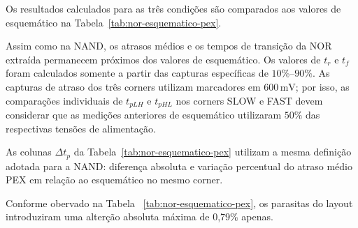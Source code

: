 \documentclass[a4paper]{article}
\begin{document}
\FloatBarrier

Os resultados calculados para as três condições são comparados aos valores de esquemático na Tabela~\ref{tab:nor-esquematico-pex}.

Assim como na NAND, os atrasos médios e os tempos de transição da NOR extraída permanecem próximos dos valores de esquemático. Os valores de $t_r$ e $t_f$ foram calculados somente a partir das capturas específicas de $10\%$--$90\%$. As capturas de atraso dos três corners utilizam marcadores em $600\,\mathrm{mV}$; por isso, as comparações individuais de $t_{pLH}$ e $t_{pHL}$ nos corners SLOW e FAST devem considerar que as medições anteriores de esquemático utilizaram $50\%$ das respectivas tensões de alimentação.

As colunas $\Delta t_p$ da Tabela~\ref{tab:nor-esquematico-pex} utilizam a mesma definição adotada para a NAND: diferença absoluta e variação percentual do atraso médio PEX em relação ao esquemático no mesmo corner.

\begin{table}[!htbp]
    \centering
    \small
    \caption{Comparação entre as simulações de esquemático e PEX da porta NOR.}
    \label{tab:nor-esquematico-pex}
\end{table}

Conforme obervado na Tabela ~\ref{tab:nor-esquematico-pex}, os parasitas do layout introduziram uma alterção absoluta máxima de 0,79\% apenas.
\end{document}
